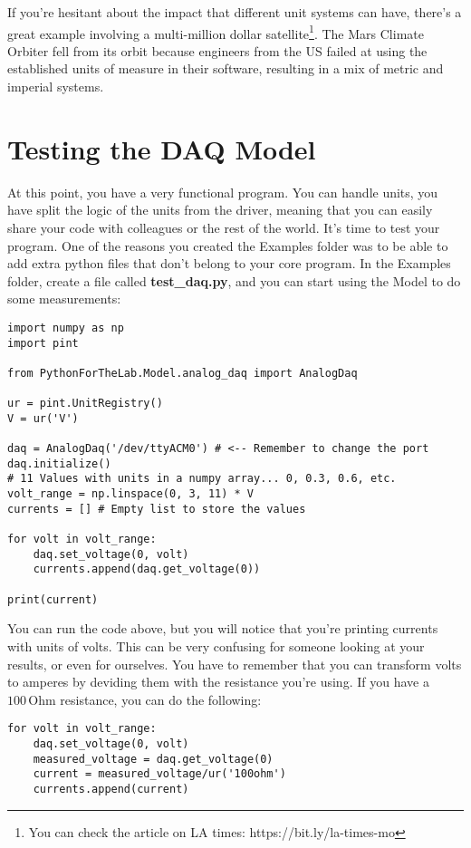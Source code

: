 If you're hesitant about the impact that different unit systems can have, there's a great example involving a multi-million dollar satellite\footnote{You can check the article on LA times: https://bit.ly/la-times-mo}. The Mars Climate Orbiter fell from its orbit because engineers from the US failed at using the established units of measure in their software, resulting in a mix of metric and imperial systems.

\section{Testing the DAQ Model}\label{sec:testing-the-daq-model}
At this point, you have a very functional program. You can handle units, you have split the logic of the units from the driver, meaning that you can easily share your code with colleagues or the rest of the world. It's time to test your program. One of the reasons you created the Examples folder was to be able to add extra python files that don't belong to your core program. In the Examples folder, create a file called \textbf{test\_daq.py}, and you can start using the Model to do some measurements:

\begin{verbatim}
import numpy as np
import pint

from PythonForTheLab.Model.analog_daq import AnalogDaq

ur = pint.UnitRegistry()
V = ur('V')

daq = AnalogDaq('/dev/ttyACM0') # <-- Remember to change the port
daq.initialize()
# 11 Values with units in a numpy array... 0, 0.3, 0.6, etc.
volt_range = np.linspace(0, 3, 11) * V
currents = [] # Empty list to store the values

for volt in volt_range:
    daq.set_voltage(0, volt)
    currents.append(daq.get_voltage(0))

print(current)
\end{verbatim}

You can run the code above, but you will notice that you're printing currents with units of volts. This can be very confusing for someone looking at your results, or even for ourselves. You have to remember that you can transform volts to amperes by deviding them with the resistance you're using. If you have a $100\,\textrm{Ohm}$ resistance, you can do the following:

\begin{verbatim}
for volt in volt_range:
    daq.set_voltage(0, volt)
    measured_voltage = daq.get_voltage(0)
    current = measured_voltage/ur('100ohm')
    currents.append(current)
\end{verbatim}

